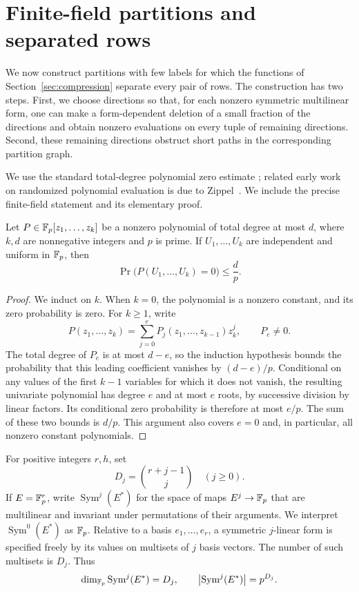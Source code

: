 \section{Finite-field partitions and separated rows}
\label{sec:partitions}

We now construct partitions with few labels for which the functions of
Section~\ref{sec:compression} separate every pair of rows.  The construction
has two steps.  First, we choose directions so that, for each nonzero
symmetric multilinear form, one can make a form-dependent deletion of a
small fraction of the directions and obtain nonzero evaluations on every
tuple of remaining directions.  Second, these remaining directions
obstruct short paths in the corresponding partition graph.

We use the standard total-degree polynomial zero estimate
\cite[Corollary~1]{Schwartz1980}; related early work on randomized
polynomial evaluation is due to Zippel~\cite{Zippel1979}. We include
the precise finite-field statement and its elementary proof.

\begin{lemma}
\label{lem:polynomial-zero}
Let $P\in\mathbb F_p[z_1,\ldots,z_k]$ be a nonzero polynomial of total degree at
most $d$, where $k,d$ are nonnegative integers and $p$ is prime.  If
$U_1,\ldots,U_k$ are independent and uniform in $\mathbb F_p$, then
\[
  \Pr\bigl(P(U_1,\ldots,U_k)=0\bigr)\le \frac{d}{p}.
\]
\end{lemma}

\begin{proof}
We induct on $k$.  When $k=0$, the polynomial is a nonzero constant,
and its zero probability is zero.  For $k\ge1$, write
\[
  P(z_1,\ldots,z_k)
  =\sum_{j=0}^{e}P_j(z_1,\ldots,z_{k-1})z_k^j,
  \qquad P_e\ne0.
\]
The total degree of $P_e$ is at most $d-e$, so the induction hypothesis
bounds the probability that this leading coefficient vanishes by
$(d-e)/p$.  Conditional on any values of the first $k-1$ variables for
which it does not vanish, the resulting univariate polynomial has degree
$e$ and at most $e$ roots, by successive division by linear factors.
Its conditional zero probability is therefore
at most $e/p$.  The sum of these two bounds is $d/p$.  This argument also
covers $e=0$ and, in particular, all nonzero constant polynomials.
\end{proof}

For positive integers $r,h$, set
\[
  D_j=\binom{r+j-1}{j}\quad(j\ge0).
\]
If $E=\mathbb F_p^r$, write $\operatorname{Sym}^j(E^*)$ for the space of
maps $E^j\to\mathbb F_p$ that are multilinear and invariant under permutations
of their arguments.  We interpret $\operatorname{Sym}^0(E^*)$ as
$\mathbb F_p$.  Relative to a basis $e_1,\ldots,e_r$, a symmetric $j$-linear
form is specified freely by its values on multisets of $j$ basis vectors.
The number of such multisets is $D_j$.  Thus
\begin{equation}
  \dim_{\mathbb F_p}\operatorname{Sym}^j(E^*)=D_j,
  \qquad
  \bigl|\operatorname{Sym}^j(E^*)\bigr|=p^{D_j}.
  \label{eq:symmetric-form-dimension}
\end{equation}

